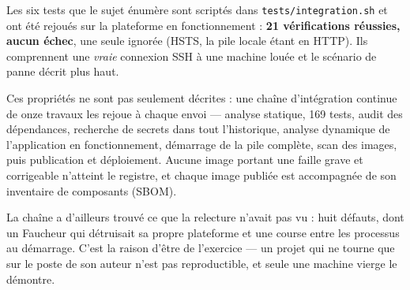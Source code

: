 \documentclass[11pt,a4paper]{article}
\begin{document}
Les six tests que le sujet énumère sont scriptés dans \texttt{tests/integration.sh} et ont été
rejoués sur la plateforme en fonctionnement : \textbf{21 vérifications réussies, aucun échec},
une seule ignorée (HSTS, la pile locale étant en HTTP). Ils comprennent une \emph{vraie} connexion
SSH à une machine louée et le scénario de panne décrit plus haut.

Ces propriétés ne sont pas seulement décrites : une chaîne d'intégration continue de onze travaux
les rejoue à chaque envoi --- analyse statique, 169 tests, audit des dépendances, recherche de
secrets dans tout l'historique, analyse dynamique de l'application en fonctionnement, démarrage de
la pile complète, scan des images, puis publication et déploiement. Aucune image portant une faille
grave et corrigeable n'atteint le registre, et chaque image publiée est accompagnée de son
inventaire de composants (SBOM).

La chaîne a d'ailleurs trouvé ce que la relecture n'avait pas vu : huit défauts, dont un Faucheur
qui détruisait sa propre plateforme et une course entre les processus au démarrage. C'est la raison
d'être de l'exercice --- un projet qui ne tourne que sur le poste de son auteur n'est pas
reproductible, et seule une machine vierge le démontre.
\end{document}
